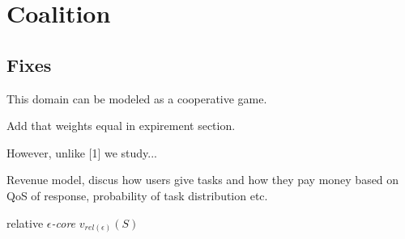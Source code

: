 \documentclass{article}
\begin{document}
  
\section{Coalition}
  
\subsection{Fixes}
  
This domain can be modeled as a cooperative game.
  
Add that weights equal in expirement section.
  
However, unlike [1] we study...
  
Revenue model, discus how users give tasks and how they pay money based on QoS of response, probability of task distribution etc.
  
relative \emph{$\epsilon$-core} $v_{rel(\epsilon)}(S)$
  
  
  
%
%
  
\end{document}
